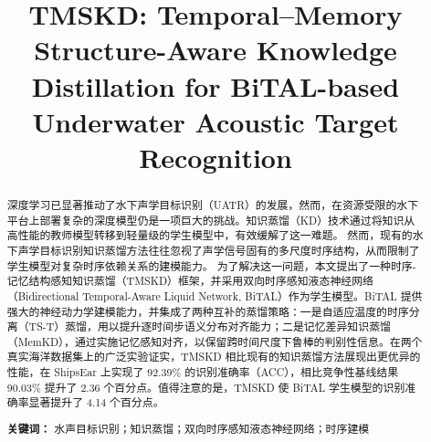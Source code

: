 \documentclass[a4paper, 12pt]{article}
\title{TMSKD: Temporal--Memory Structure-Aware Knowledge Distillation for BiTAL-based Underwater Acoustic Target Recognition}
\date{}
\begin{document}
\maketitle
\begin{abstract}
深度学习已显著推动了水下声学目标识别（UATR）的发展，然而，在资源受限的水下平台上部署复杂的深度模型仍是一项巨大的挑战。知识蒸馏（KD）技术通过将知识从高性能的教师模型转移到轻量级的学生模型中，有效缓解了这一难题。
然而，现有的水下声学目标识别知识蒸馏方法往往忽视了声学信号固有的多尺度时序结构，从而限制了学生模型对复杂时序依赖关系的建模能力。
为了解决这一问题，本文提出了一种时序-记忆结构感知知识蒸馏（TMSKD）框架，并采用双向时序感知液态神经网络（Bidirectional Temporal-Aware Liquid Network, BiTAL）作为学生模型。BiTAL 提供强大的神经动力学建模能力，并集成了两种互补的蒸馏策略：一是自适应温度的时序分离（TS-T）蒸馏，用以提升逐时间步语义分布对齐能力；二是记忆差异知识蒸馏（MemKD），通过实施记忆感知对齐，以保留跨时间尺度下鲁棒的判别性信息。在两个真实海洋数据集上的广泛实验证实，TMSKD 相比现有的知识蒸馏方法展现出更优异的性能，在 ShipsEar 上实现了 92.39\% 的识别准确率（ACC），相比竞争性基线结果 90.03\% 提升了 2.36 个百分点。值得注意的是，TMSKD 使 BiTAL 学生模型的识别准确率显著提升了 4.14 个百分点。



\textbf{关键词：} 水声目标识别；知识蒸馏；双向时序感知液态神经网络；时序建模
\end{abstract}
\end{document}
